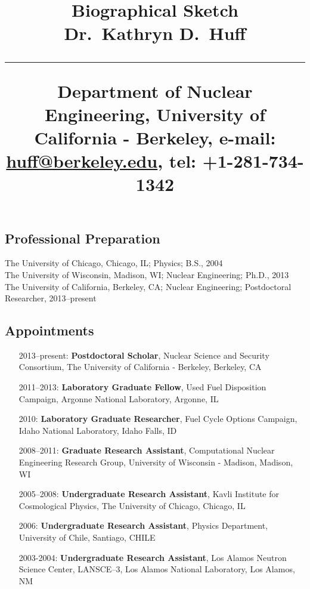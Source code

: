 \documentclass[svgnames,11pt]{article}
\title{%
        \vspace{-2\baselineskip}
            \normalsize
            Biographical Sketch\\
            {\large\textbf{Dr.~Kathryn D.~Huff}}\\
            \vspace{0.5\baselineskip}
            \hrule
            \vspace{0.5\baselineskip}
            Department of Nuclear Engineering, University of California - Berkeley,
            e-mail: \href{mailto:huf@berkeley.edu}{huff@berkeley.edu},
            tel: +1-281-734-1342
        \vspace{-1.5ex}
        }
\date{}
\author{}
\begin{document}
\maketitle
\vspace{-4\baselineskip}

\subsection{Professional Preparation}

    The University of Chicago, Chicago, IL;
        Physics;
        B.S., 2004
        \\
    The University of Wisconsin, Madison, WI;
        Nuclear Engineering;
        Ph.D., 2013
        \\
    The University of California, Berkeley, CA;
        Nuclear Engineering;
        Postdoctoral Researcher, 2013--present
        \\

\subsection{Appointments}

\begin{itemize}[label={--9999:},leftmargin=*,itemsep=0pt]

    \item[2013--present:]
        \textbf{Postdoctoral Scholar},
        Nuclear Science and Security Consortium,
        The University of California - Berkeley,
        Berkeley, CA

    \item[2011--2013:]
      \textbf{Laboratory Graduate Fellow},
        Used Fuel Disposition Campaign,
        Argonne National Laboratory,
        Argonne, IL

    \item[2010:]
        \textbf{Laboratory Graduate Researcher},
        Fuel Cycle Options Campaign,
        Idaho National Laboratory,
        Idaho Falls, ID

    \item[2008--2011:]
        \textbf{Graduate Research Assistant},
        Computational Nuclear Engineering Research Group,
        University of Wisconsin - Madison,
        Madison, WI

    \item[2005--2008:]
      \textbf{Undergraduate Research Assistant},
        Kavli Institute for Cosmological Physics,
        The University of Chicago,
        Chicago, IL

    \item[2006:]
      \textbf{Undergraduate Research Assistant},
        Physics Department,
        University of Chile, 
        Santiago, CHILE

    \item[2003-2004:]
      \textbf{Undergraduate Research Assistant},
        Los Alamos Neutron Science Center, LANSCE--3,
        Los Alamos National Laboratory,
        Los Alamos, NM

\end{itemize}
\end{document}

